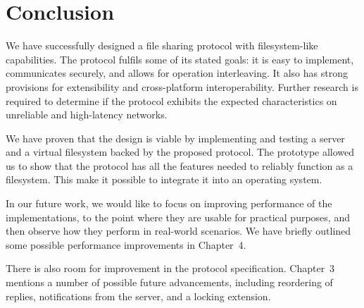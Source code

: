 
\chapter*{Conclusion}

We have successfully designed a file sharing protocol with filesystem-like capabilities. The protocol fulfils
some of its stated goals: it is easy to implement, communicates securely, and allows for operation
interleaving.  It also has strong provisions for extensibility and cross-platform interoperability.  Further
research is required to determine if the protocol exhibits the expected characteristics on unreliable and
high-latency networks.

We have proven that the design is viable by implementing and testing a server and a virtual filesystem backed
by the proposed protocol. The prototype allowed us to show that the protocol has all the features needed to
reliably function as a filesystem. This make it possible to integrate it into an operating system.

In our future work, we would like to focus on improving performance of the implementations, to the point where
they are usable for practical purposes, and then observe how they perform in real-world scenarios. We have
briefly outlined some possible performance improvements in Chapter~4.

There is also room for improvement in the protocol specification. Chapter~3 mentions a number of
possible future advancements, including reordering of replies, notifications from the server, and a locking
extension.
